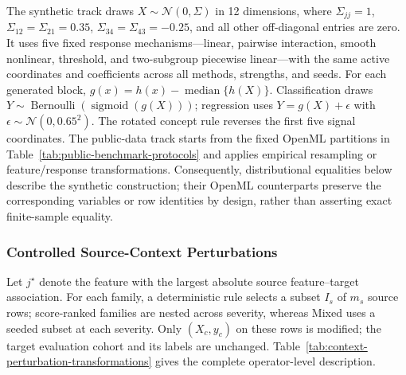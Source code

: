 The synthetic track draws $X\sim\mathcal N(0,\Sigma)$ in 12 dimensions, where
$\Sigma_{jj}=1$, $\Sigma_{12}=\Sigma_{21}=0.35$,
$\Sigma_{34}=\Sigma_{43}=-0.25$, and all other off-diagonal entries are zero.
It uses five fixed response mechanisms---linear, pairwise interaction, smooth
nonlinear, threshold, and two-subgroup piecewise linear---with the same active
coordinates and coefficients across all methods, strengths, and seeds.
For each generated block, $g(x)=h(x)-\operatorname{median}\{h(X)\}$.
Classification draws $Y\sim\operatorname{Bernoulli}(\operatorname{sigmoid}(g(X)))$;
regression uses $Y=g(X)+\epsilon$ with
$\epsilon\sim\mathcal N(0,0.65^2)$. The rotated concept rule reverses the
first five signal coordinates. The public-data track starts from the fixed OpenML partitions in
Table~\ref{tab:public-benchmark-protocols} and applies empirical resampling or
feature/response transformations.  Consequently, distributional equalities
below describe the synthetic construction; their OpenML counterparts preserve
the corresponding variables or row identities by design, rather than asserting
exact finite-sample equality.

\subsubsection{Controlled Source-Context Perturbations}

Let $j^\star$ denote the feature with the largest absolute source
feature--target association.  For each family, a deterministic rule selects a
subset $I_s$ of $m_s$ source rows; score-ranked families are nested across
severity, whereas Mixed uses a seeded subset at each severity.  Only
$(X_c,y_c)$ on these rows is modified; the target evaluation cohort and its
labels are unchanged.
Table~\ref{tab:context-perturbation-transformations} gives the complete
operator-level description.

